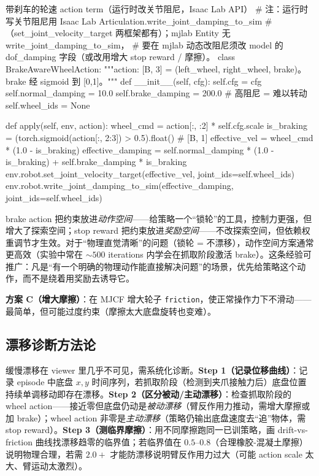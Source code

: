 \begin{codebox}[Python]{带刹车的轮速 action term（运行时改关节阻尼，Isaac Lab API）}
# 注：运行时写关节阻尼用 Isaac Lab Articulation.write_joint_damping_to_sim
# （set_joint_velocity_target 两框架都有）；mjlab Entity 无 write_joint_damping_to_sim，
# 要在 mjlab 动态改阻尼须改 model 的 dof_damping 字段（或改用增大 stop reward / 摩擦）。
class BrakeAwareWheelAction:
    """action: [B, 3] = (left_wheel, right_wheel, brake)。brake 经 sigmoid 到 [0,1]。"""
    def __init__(self, cfg):
        self.cfg = cfg
        self.normal_damping = 10.0
        self.brake_damping  = 200.0    # 高阻尼 = 难以转动
        self.wheel_ids = None

    def apply(self, env, action):
        wheel_cmd  = action[:, :2] * self.cfg.scale
        is_braking = (torch.sigmoid(action[:, 2:3]) > 0.5).float()   # [B, 1]
        effective_vel     = wheel_cmd * (1.0 - is_braking)
        effective_damping = self.normal_damping * (1.0 - is_braking) + self.brake_damping * is_braking
        env.robot.set_joint_velocity_target(effective_vel, joint_ids=self.wheel_ids)
        env.robot.write_joint_damping_to_sim(effective_damping, joint_ids=self.wheel_ids)
\end{codebox}

\begin{insight}\label{ins:rlmc-wh-where}
brake action 把约束放进\emph{动作空间}——给策略一个“锁轮”的工具，控制力更强，但增大了探索空间；stop reward 把约束放进\emph{奖励空间}——不改探索空间，但依赖权重调节才生效。对于“物理直觉清晰”的问题（锁轮 = 不漂移），动作空间方案通常更高效（实验中常在 $\sim 500$ iterations 内学会在抓取阶段激活 brake）。这条经验可推广：凡是“有一个明确的物理动作能直接解决问题”的场景，优先给策略这个动作，而不是绕着用奖励去诱导它。
\end{insight}

\textbf{方案 C（增大摩擦）}：在 MJCF 增大轮子 \verb|friction|，使正常操作力下不滑动——最简单，但可能过度约束（摩擦太大底盘旋转也变难）。

\subsection{漂移诊断方法论}
\label{sec:rlmc-wh-drift-diag}

缓慢漂移在 viewer 里几乎不可见，需系统化诊断。\textbf{Step 1（记录位移曲线）}：记录 episode 中底盘 $x,y$ 时间序列，若抓取阶段（检测到夹爪接触力后）底盘位置持续单调移动即存在漂移。\textbf{Step 2（区分被动/主动漂移）}：检查抓取阶段的 wheel action——接近零但底盘仍动是\emph{被动漂移}（臂反作用力推动，需增大摩擦或加 brake）；wheel action 非零是\emph{主动漂移}（策略仍输出底盘速度去“追”物体，需 stop reward）。\textbf{Step 3（测临界摩擦）}：用不同摩擦跑同一已训策略，画 drift-vs-friction 曲线找漂移趋零的临界值；若临界值在 $0.5$--$0.8$（合理橡胶-混凝土摩擦）说明物理合理，若需 $2.0+$ 才能防漂移说明臂反作用力过大（可能 action scale 太大、臂运动太激烈）。

